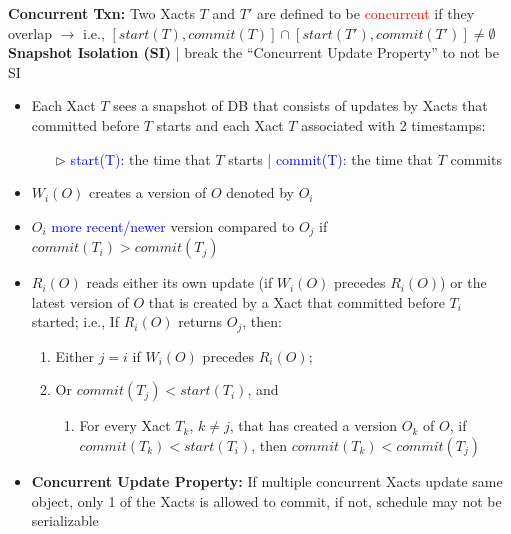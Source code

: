 \documentclass[10pt,landscape]{article}
\newcommand{\1}{\mathmybb{1}}
\begin{document}
\begin{multicols*}{3}
\textbf{Concurrent Txn:} Two Xacts $T$ and $T'$ are defined to be \textcolor{red}{concurrent} if they overlap $\rightarrow$ i.e., $[start(T),commit(T)] \cap [start(T'),commit(T')] \neq \emptyset$ \\ 
\textbf{Snapshot Isolation (SI)} | break the “Concurrent Update Property” to not be SI
\begin{itemize}
    \item Each Xact $T$ sees a snapshot of DB that consists of updates by Xacts that committed before $T$ starts and each Xact $T$ associated with 2 timestamps:
    \begin{itemize}
        \item[$\triangleright$] \textcolor{blue}{start(T)}: the time that $T$ starts | \textcolor{blue}{commit(T)}: the time that $T$ commits
    \end{itemize}
    \item $W_i(O)$ creates a version of $O$ denoted by $O_i$
    \item $O_i$ \textcolor{blue}{more recent/newer} version compared to $O_j$ if $commit(T_i) > commit(T_j)$
    \item $R_i(O)$ reads either its own update (if $W_i(O)$ precedes $R_i(O)$) or the latest version of $O$ that is created by a Xact that committed before $T_i$ started; i.e., If $R_i(O)$ returns $O_j$, then:
    \begin{enumerate}
        \item Either $j = i$ if $W_i(O)$ precedes $R_i(O)$;
        \item Or $commit(T_j) < start(T_i)$, and
        \begin{enumerate}
            \item For every Xact $T_k$, $k \neq j$, that has created a version $O_k$ of $O$, if $commit(T_k) < start(T_i)$, then $commit(T_k) < commit(T_j)$
        \end{enumerate}
    \end{enumerate}
    \item \textbf{Concurrent Update Property:} If multiple concurrent Xacts update same object, only 1 of the Xacts is allowed to commit, if not, schedule may not be serializable

\end{itemize}
\end{multicols*}
\end{document}
